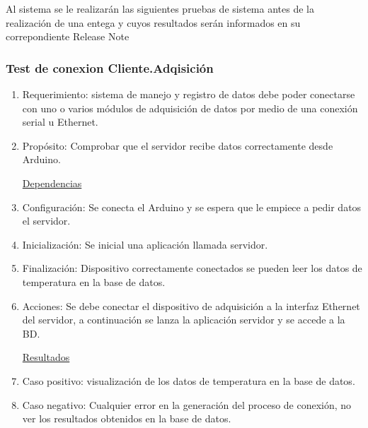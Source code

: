 Al sistema se le realizarán las siguientes pruebas de sistema antes de la realización de una entega y cuyos resultados serán informados en su correpondiente Release Note


 \subsubsection{\textcolor[gray]{.2}{Test de conexion Cliente.Adqisición }}

\begin{enumerate}
\item Requerimiento: sistema de manejo y registro de datos debe poder conectarse con uno o varios módulos de adquisición de datos por medio de una conexión serial u Ethernet.
\item Propósito: Comprobar que el servidor recibe datos correctamente desde Arduino.
 
\underline{\textcolor[gray]{.8}{Dependencias}}

\item Configuración: Se conecta el Arduino y se espera que le empiece a pedir datos el servidor.
\item Inicialización: Se inicial una aplicación llamada servidor.
\item Finalización: Dispositivo correctamente conectados se pueden leer los datos de temperatura en la base de datos.   
\item Acciones: Se debe conectar el dispositivo de adquisición a la interfaz Ethernet del servidor, a continuación se lanza la aplicación servidor y se accede a la BD.

\underline{\textcolor[gray]{.8}{Resultados}} 

\item Caso positivo: visualización de los datos de temperatura en la base de datos.
\item Caso negativo: Cualquier error en la generación del proceso de conexión, no ver los resultados obtenidos en la base de datos.

\end{enumerate}

